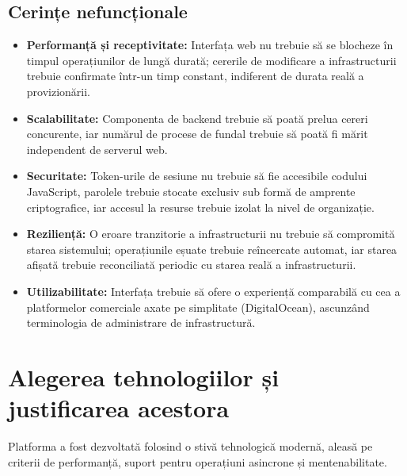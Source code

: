 \subsection{Cerințe nefuncționale}
\begin{itemize}
    \item \textbf{Performanță și receptivitate:} Interfața web nu trebuie să se blocheze în timpul operațiunilor de lungă durată; cererile de modificare a infrastructurii trebuie confirmate într-un timp constant, indiferent de durata reală a provizionării.
    \item \textbf{Scalabilitate:} Componenta de backend trebuie să poată prelua cereri concurente, iar numărul de procese de fundal trebuie să poată fi mărit independent de serverul web.
    \item \textbf{Securitate:} Token-urile de sesiune nu trebuie să fie accesibile codului JavaScript, parolele trebuie stocate exclusiv sub formă de amprente criptografice, iar accesul la resurse trebuie izolat la nivel de organizație.
    \item \textbf{Reziliență:} O eroare tranzitorie a infrastructurii nu trebuie să compromită starea sistemului; operațiunile eșuate trebuie reîncercate automat, iar starea afișată trebuie reconciliată periodic cu starea reală a infrastructurii.
    \item \textbf{Utilizabilitate:} Interfața trebuie să ofere o experiență comparabilă cu cea a platformelor comerciale axate pe simplitate (DigitalOcean), ascunzând terminologia de administrare de infrastructură.
\end{itemize}

\section{Alegerea tehnologiilor și justificarea acestora}
\label{sec:cap3_tehnologii}

Platforma a fost dezvoltată folosind o stivă tehnologică modernă, aleasă pe criterii de performanță, suport pentru operațiuni asincrone și mentenabilitate.

